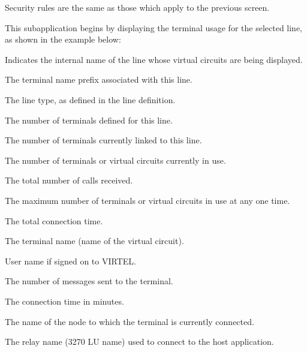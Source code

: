 \documentclass[letterpaper,10pt,english]{sphinxmanual}
\begin{document}
\sphinxAtStartPar
Security rules are the same as those which apply to the previous screen.

\sphinxAtStartPar
This sub\sphinxhyphen{}application begins by displaying the terminal usage for the selected line, as shown in the example below:

\sphinxAtStartPar
{}

\sphinxAtStartPar
{}
\begin{description}
\sphinxAtStartPar
Indicates the internal name of the line whose virtual circuits are being displayed.

\sphinxAtStartPar
The terminal name prefix associated with this line.

\sphinxAtStartPar
The line type, as defined in the line definition.

\sphinxAtStartPar
The number of terminals defined for this line.

\sphinxAtStartPar
The number of terminals currently linked to this line.

\sphinxAtStartPar
The number of terminals or virtual circuits currently in use.

\sphinxAtStartPar
The total number of calls received.

\sphinxAtStartPar
The maximum number of terminals or virtual circuits in use at any one time.

\sphinxAtStartPar
The total connection time.

\sphinxAtStartPar
The terminal name (name of the virtual circuit).

\sphinxAtStartPar
User name if signed on to VIRTEL.

\sphinxAtStartPar
The number of messages sent to the terminal.

\sphinxAtStartPar
The connection time in minutes.

\sphinxAtStartPar
The name of the node to which the terminal is currently connected.

\sphinxAtStartPar
The relay name (3270 LU name) used to connect to the host application.


\end{description}
\end{document}
